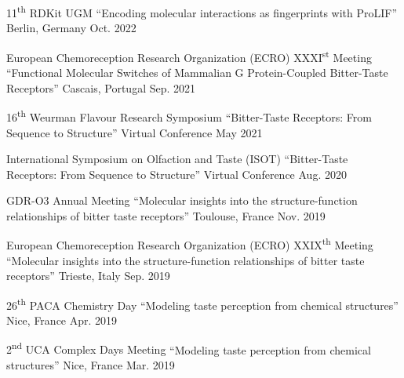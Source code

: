 
\begin{cvhonors}

    \cvhonor
    {11\textsuperscript{th} RDKit UGM}
    {``Encoding molecular interactions as fingerprints with ProLIF''}
    {Berlin, Germany}
    {Oct. 2022}

    \cvhonor
    {European Chemoreception Research Organization (ECRO) \textsc{XXXI}\textsuperscript{st} Meeting}
    {``Functional Molecular Switches of Mammalian G Protein-Coupled Bitter-Taste Receptors''}
    {Cascais, Portugal}
    {Sep. 2021}

    \cvhonor
    {16\textsuperscript{th} Weurman Flavour Research Symposium}
    {``Bitter-Taste Receptors: From Sequence to Structure''}
    {Virtual Conference}
    {May 2021}

    \cvhonor
    {International Symposium on Olfaction and Taste (ISOT)}
    {``Bitter-Taste Receptors: From Sequence to Structure''}
    {Virtual Conference}
    {Aug. 2020}

    \cvhonor
    {GDR-O3 Annual Meeting}
    {``Molecular insights into the structure-function relationships of bitter taste receptors''}
    {Toulouse, France}
    {Nov. 2019}

    \cvhonor
    {European Chemoreception Research Organization (ECRO) \textsc{XXIX}\textsuperscript{th} Meeting}
    {``Molecular insights into the structure-function relationships of bitter taste receptors''}
    {Trieste, Italy}
    {Sep. 2019}

    \cvhonor
    {26\textsuperscript{th} PACA Chemistry Day}
    {``Modeling taste perception from chemical structures''}
    {Nice, France}
    {Apr. 2019}

    \cvhonor
    {2\textsuperscript{nd} UCA Complex Days Meeting}
    {``Modeling taste perception from chemical structures''}
    {Nice, France}
    {Mar. 2019}

\end{cvhonors}

